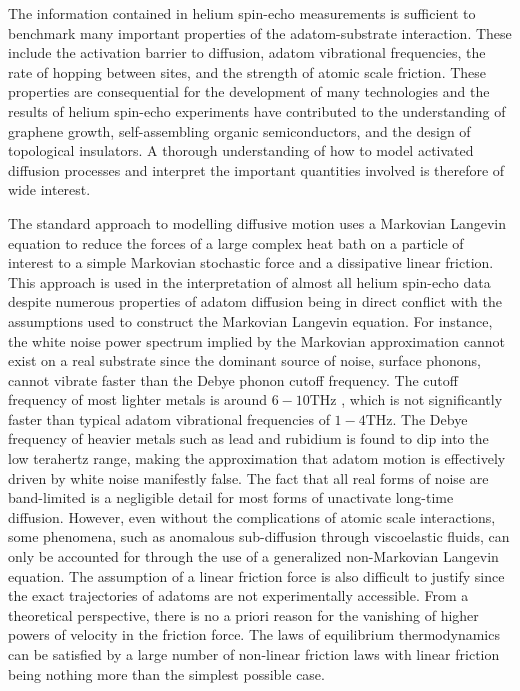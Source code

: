 \documentclass[7pt]{article}
\newcommand{\THz}{\si{\tera\hertz}}
\begin{document}
The information contained in helium spin-echo measurements is sufficient to benchmark many important properties of the adatom-substrate interaction. These include the activation barrier to diffusion, adatom vibrational frequencies, the rate of hopping between sites, and the strength of atomic scale friction\cite{Jardine200911, Lechner2015, Alexandrowicz, Hedgeland}. These properties are consequential for the development of many technologies and the results of helium spin-echo experiments have contributed to the understanding of graphene growth, self-assembling organic semiconductors, and the design of topological insulators\cite{Tamtgl2015, Townsend, Sacchi, Tamtgl2020}. A thorough understanding of how to model activated diffusion processes and interpret the important quantities involved is therefore of wide interest.
 
The standard approach to modelling diffusive motion uses a Markovian Langevin equation to reduce the forces of a large complex heat bath on a particle of interest to a simple Markovian stochastic force and a dissipative linear friction\cite{Kramers, Zwanzig, Kubo}. This approach is used in the interpretation of almost all helium spin-echo data\cite{Jardine200911, Jardine200906} despite numerous properties of adatom diffusion being in direct conflict with the assumptions used to construct the Markovian Langevin equation.  For instance, the white noise power spectrum implied by the Markovian approximation cannot exist on a real substrate since the dominant source of noise, surface phonons\cite{Rittmeyer2016}, cannot vibrate faster than the Debye phonon cutoff frequency. The cutoff frequency of most lighter metals is around $6-10\THz$ \cite{Sinha, Rao, Zarestky, Stedman1966}, which is not significantly faster than typical adatom vibrational frequencies of $1-4\THz$\cite{Ellis1995, Senet1999LowfrequencyVO, Hofmann1996}. The Debye frequency of heavier metals such as lead and rubidium is found to dip into the low terahertz range\cite{Brockhouse, Copley1973}, making the approximation that adatom motion is effectively driven by white noise manifestly false. The fact that all real forms of noise are band-limited is a negligible detail for most forms of unactivate long-time diffusion\cite{Townsend2018, GlattHoltz2020}. However, even without the complications of atomic scale interactions, some phenomena, such as anomalous sub-diffusion through viscoelastic fluids, can only be accounted for through the use of a generalized non-Markovian Langevin equation\cite{Kubo, GlattHoltz2020, Mason}. The assumption of a linear friction force is also difficult to justify since the exact trajectories of adatoms are not experimentally accessible. From a theoretical perspective, there is no a priori reason for the vanishing of higher powers of velocity in the friction force\cite{Kramers}. The laws of equilibrium thermodynamics can be satisfied by a large number of non-linear friction laws with linear friction being nothing more than the simplest possible case. 
\end{document}
